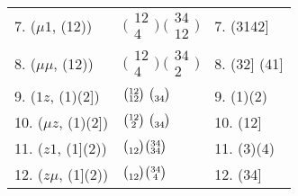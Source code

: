 \documentclass{surv-l}
\numberwithin{equation}{section}
\numberwithin{table}{section}
\numberwithin{figure}{section}
\theoremstyle{definition}
\begin{document}
\begin{table}[]
{\begin{tabular}{@{}|l|l|l|@{}}
7. ($\mu 1$, (12))&$\big(\!\begin{smallmatrix}12 \\ 4\end{smallmatrix}\!\big)\ \big(\!\begin{smallmatrix}34 \\ 12\end{smallmatrix}\!\big)$&7. (3142] \\[3pt]
8. ($\mu\mu$, (12))&$\big(\!\begin{smallmatrix}12 \\ 4\end{smallmatrix}\!\big)\ \big(\!\begin{smallmatrix}34 \\ 2\end{smallmatrix}\!\big)$&8. (32] (41] \\[3pt]
9. ($1z$, (1)(2])&$\big(\!\begin{smallmatrix}12 \\ 12\end{smallmatrix}\!\big)\ \big(\!\begin{smallmatrix}\vphantom{34}\\ 34\end{smallmatrix}\!\big)$&9. (1)(2) \\[3pt]
10. ($\mu z$, (1)(2])&$\big(\!\begin{smallmatrix}12 \\ 2\end{smallmatrix}\!\big)\ \big(\!\begin{smallmatrix}\vphantom{34}\\ 34\end{smallmatrix}\!\big)$&10. (12] \\[3pt]
11. ($z1$, (1](2))&$\big(\!\begin{smallmatrix}\vphantom{12}\\ 12\end{smallmatrix}\!\big) \big(\!\begin{smallmatrix}34 \\ 34\end{smallmatrix}\!\big)$&11. (3)(4) \\[3pt]
12. ($z\mu$, (1](2))&$\big(\!\begin{smallmatrix}\vphantom{12}\\ 12\end{smallmatrix}\!\big) \big(\!\begin{smallmatrix}34 \\ 4\end{smallmatrix}\!\big)$&12. (34] \\[3pt]

\end{tabular}}
\end{table}
\end{document}
